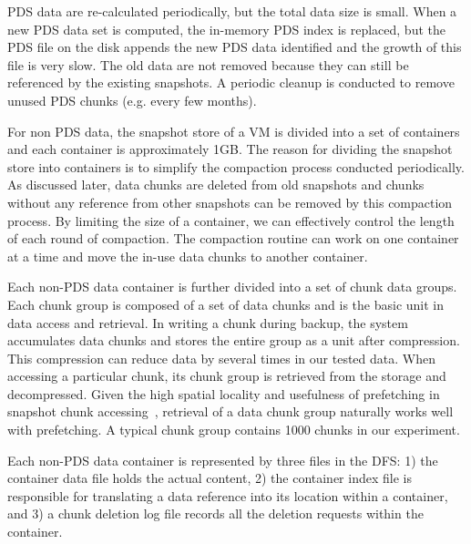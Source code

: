 PDS data are re-calculated periodically, but 
the total data size is small.  When
a new PDS data  set is computed, the in-memory PDS index is replaced, but 
the PDS file on the disk appends the  new PDS data identified and the growth of this file is very slow. 
The old data are not removed because they can still be referenced by the existing snapshots. 
A periodic cleanup is conducted  to remove unused PDS chunks (e.g. every few months). 


For non PDS data, the snapshot store of a VM is  divided into a set of containers and 
each container is approximately 1GB. 
The reason for dividing the snapshot store into containers is to simplify the compaction process
conducted periodically. As discussed later, data chunks are deleted from old snapshots
and chunks without any reference from other snapshots can be removed by this compaction process.
By limiting the size of a container, we can effectively control the length of each round of compaction.
The compaction  routine can work on one container at a time and move the in-use data chunks to another container. 

Each non-PDS data container is further divided into a set of chunk data groups. Each chunk group is composed of
a set of data chunks and is the basic unit in data access and retrieval. 
In writing a chunk during backup, the system accumulates data chunks and stores the entire
group as a unit after compression. This  compression can reduce data by several times  in our tested data.
When accessing a particular chunk, its chunk group is retrieved from the storage
and decompressed. Given the high spatial locality and usefulness of prefetching  in 
snapshot chunk accessing~\cite{Guo2011,foundation08},
retrieval of  a data chunk  group naturally works well with prefetching. 
A  typical chunk group contains 1000 chunks in our experiment.

Each non-PDS data container is represented by three files in the DFS:
1) the container data file holds the actual content, 
2) the container index file is responsible for translating a data reference
into its location within a container, and 
3) a chunk deletion log file records all the deletion requests within  the container.

